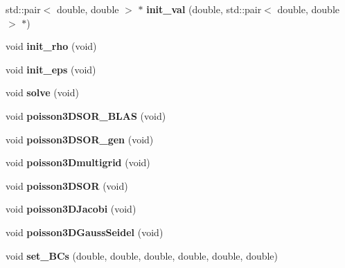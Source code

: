 \begin{DoxyCompactItemize}
\item 
std\+::pair$<$ double, double $>$ $\ast$ {\bfseries init\+\_\+val} (double, std\+::pair$<$ double, double $>$ $\ast$)\hypertarget{classSolver_a1503790b3c572e0dd3761e8ffa159ef7}{}\label{classSolver_a1503790b3c572e0dd3761e8ffa159ef7}

\item 
void {\bfseries init\+\_\+rho} (void)\hypertarget{classSolver_aaae2b9d2acb1cabf8f7b949660b85285}{}\label{classSolver_aaae2b9d2acb1cabf8f7b949660b85285}

\item 
void {\bfseries init\+\_\+eps} (void)\hypertarget{classSolver_a1aaa610e19503aa2d69069ffa4bd8e96}{}\label{classSolver_a1aaa610e19503aa2d69069ffa4bd8e96}

\item 
void {\bfseries solve} (void)\hypertarget{classSolver_a4eac571b3023459e045fc0222eef9ca8}{}\label{classSolver_a4eac571b3023459e045fc0222eef9ca8}

\item 
void {\bfseries poisson3\+D\+S\+O\+R\+\_\+\+B\+L\+AS} (void)\hypertarget{classSolver_a285860ed16dd0d26d60dd224f424a183}{}\label{classSolver_a285860ed16dd0d26d60dd224f424a183}

\item 
void {\bfseries poisson3\+D\+S\+O\+R\+\_\+gen} (void)\hypertarget{classSolver_a7a035b835487ca6dba08ba6c83182703}{}\label{classSolver_a7a035b835487ca6dba08ba6c83182703}

\item 
void {\bfseries poisson3\+Dmultigrid} (void)\hypertarget{classSolver_afa4e3c2a5659e5a43fb5380d6ff2ab77}{}\label{classSolver_afa4e3c2a5659e5a43fb5380d6ff2ab77}

\item 
void {\bfseries poisson3\+D\+S\+OR} (void)\hypertarget{classSolver_ad068c30b00e28888787050ced515e4fd}{}\label{classSolver_ad068c30b00e28888787050ced515e4fd}

\item 
void {\bfseries poisson3\+D\+Jacobi} (void)\hypertarget{classSolver_a7a7d9f182332e724b1c706383d1d0d89}{}\label{classSolver_a7a7d9f182332e724b1c706383d1d0d89}

\item 
void {\bfseries poisson3\+D\+Gauss\+Seidel} (void)\hypertarget{classSolver_ab2eaf2b57f815535966fc04358ef6f81}{}\label{classSolver_ab2eaf2b57f815535966fc04358ef6f81}

\item 
void {\bfseries set\+\_\+\+B\+Cs} (double, double, double, double, double, double)\hypertarget{classSolver_af657268408584afd8dc9b91d33684657}{}\label{classSolver_af657268408584afd8dc9b91d33684657}


\end{DoxyCompactItemize}
